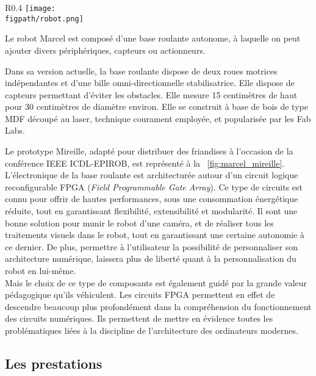 \documentclass[a4paper,12pt]{report}
\newcommand{\figpath}{figures}
\begin{document}
\begin{wrapfigure}{R}{0.4\textwidth}
	\centering
	\texttt{[image: \\figpath/robot.png]}
	\caption{\label{fig:marcel_mireille}Base roulante Marcel : Prototype \og{}Mireille\fg{}.}
\end{wrapfigure}

Le robot Marcel est composé d'une base roulante autonome, à laquelle on peut ajouter divers périphériques, capteurs ou actionneurs.

Dans sa version actuelle, la base roulante dispose de deux roues motrices indépendantes et d'une bille omni-directionnelle stabilisatrice.
Elle dispose de capteurs permettant d'éviter les obstacles.
Elle mesure 15 centimètres de haut pour 30 centimètres de diamètre environ.
Elle se construit à base de bois de type MDF découpé au laser, technique courament employée, et popularisée par les Fab Labs.

Le prototype \og{}Mireille\fg{}, adapté pour distribuer des friandises à l'occasion de la conférence IEEE ICDL-EPIROB, est représenté à la \figurename~\ref{fig:marcel_mireille}.\\

L'électronique de la base roulante est architecturée autour d'un circuit logique reconfigurable FPGA (\emph{Field Programmable Gate Array}).
Ce type de circuits est connu pour offrir de hautes performances, sous une consommation énergétique réduite, tout en garantissant flexibilité, extensibilité et modularité.
Il sont une bonne solution pour munir le robot d'une caméra, et de réaliser tous les traitements visuels dans le robot, tout en garantissant une certaine autonomie à ce dernier.
De plus, permettre à l'utilisateur la possibilité de personnaliser son architecture numérique, laissera plus de liberté quant à la personnalisation du robot en lui-même.\\

Mais le choix de ce type de composants est également guidé par la grande valeur pédagogique qu'ils véhiculent.
Les circuits FPGA permettent en effet de descendre beaucoup plus profondément dans la compréhension du fonctionnement des circuits numériques.
Ils permettent de mettre en évidence toutes les problématiques liées à la discipline de l'architecture des ordinateurs modernes.


\subsection{Les prestations}
\end{document}
